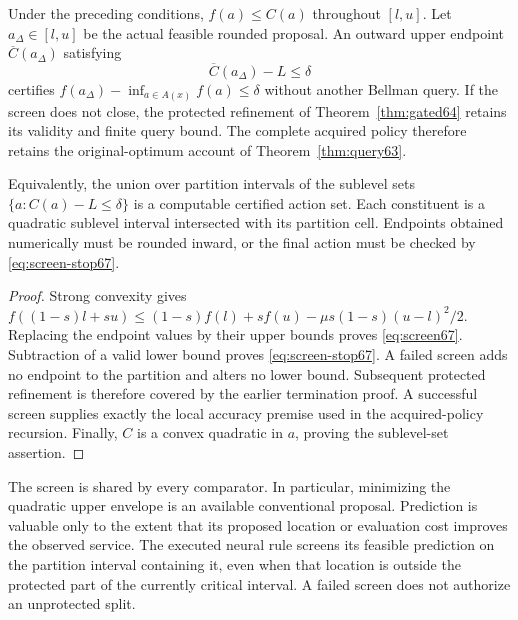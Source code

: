 \begin{theorem}\label{thm:screen67}
Under the preceding conditions, $f(a)\le C(a)$ throughout $[l,u]$. Let $a_\Delta\in[l,u]$ be the actual feasible rounded proposal. An outward upper endpoint $\overline C(a_\Delta)$ satisfying
\begin{equation}\label{eq:screen-stop67}
 \overline C(a_\Delta)-L\le\delta
\end{equation}
certifies $f(a_\Delta)-\inf_{a\in A(x)}f(a)\le\delta$ without another Bellman query. If the screen does not close, the protected refinement of Theorem~\ref{thm:gated64} retains its validity and finite query bound. The complete acquired policy therefore retains the original-optimum account of Theorem~\ref{thm:query63}.

Equivalently, the union over partition intervals of the sublevel sets $\{a:C(a)-L\le\delta\}$ is a computable certified action set. Each constituent is a quadratic sublevel interval intersected with its partition cell. Endpoints obtained numerically must be rounded inward, or the final action must be checked by \eqref{eq:screen-stop67}.
\end{theorem}
\begin{proof}
Strong convexity gives $f((1-s)l+su)\le(1-s)f(l)+sf(u)-\mu s(1-s)(u-l)^2/2$. Replacing the endpoint values by their upper bounds proves \eqref{eq:screen67}. Subtraction of a valid lower bound proves \eqref{eq:screen-stop67}. A failed screen adds no endpoint to the partition and alters no lower bound. Subsequent protected refinement is therefore covered by the earlier termination proof. A successful screen supplies exactly the local accuracy premise used in the acquired-policy recursion. Finally, $C$ is a convex quadratic in $a$, proving the sublevel-set assertion.
\end{proof}

The screen is shared by every comparator. In particular, minimizing the quadratic upper envelope is an available conventional proposal. Prediction is valuable only to the extent that its proposed location or evaluation cost improves the observed service. The executed neural rule screens its feasible prediction on the partition interval containing it, even when that location is outside the protected part of the currently critical interval. A failed screen does not authorize an unprotected split.


